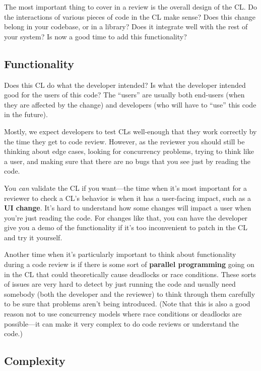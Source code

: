 \documentclass[
]{article}
\begin{document}
The most important thing to cover in a review is the overall design of
the CL. Do the interactions of various pieces of code in the CL make
sense? Does this change belong in your codebase, or in a library? Does
it integrate well with the rest of your system? Is now a good time to
add this functionality?

\subsection{Functionality}\label{functionality}

Does this CL do what the developer intended? Is what the developer
intended good for the users of this code? The ``users'' are usually both
end-users (when they are affected by the change) and developers (who
will have to ``use'' this code in the future).

Mostly, we expect developers to test CLs well-enough that they work
correctly by the time they get to code review. However, as the reviewer
you should still be thinking about edge cases, looking for concurrency
problems, trying to think like a user, and making sure that there are no
bugs that you see just by reading the code.

You \emph{can} validate the CL if you want---the time when it's most
important for a reviewer to check a CL's behavior is when it has a
user-facing impact, such as a \textbf{UI change}. It's hard to
understand how some changes will impact a user when you're just reading
the code. For changes like that, you can have the developer give you a
demo of the functionality if it's too inconvenient to patch in the CL
and try it yourself.

Another time when it's particularly important to think about
functionality during a code review is if there is some sort of
\textbf{parallel programming} going on in the CL that could
theoretically cause deadlocks or race conditions. These sorts of issues
are very hard to detect by just running the code and usually need
somebody (both the developer and the reviewer) to think through them
carefully to be sure that problems aren't being introduced. (Note that
this is also a good reason not to use concurrency models where race
conditions or deadlocks are possible---it can make it very complex to do
code reviews or understand the code.)

\subsection{Complexity}\label{complexity}
\end{document}
